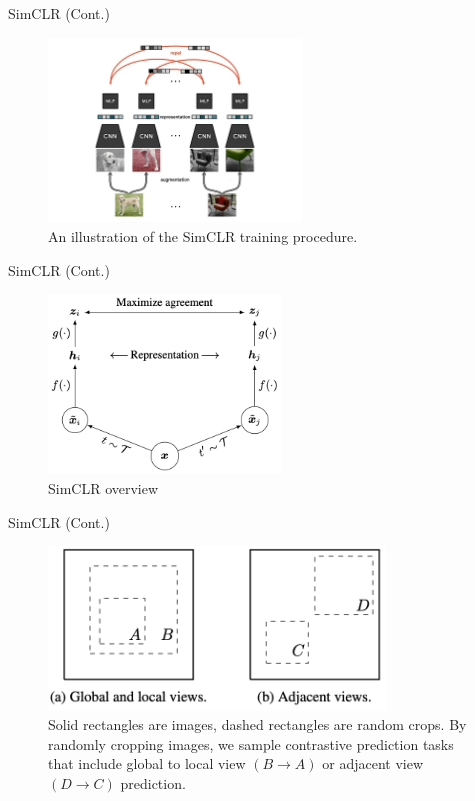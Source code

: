 \documentclass[serif, aspectratio=169]{beamer}
\begin{document}
\begin{frame}{SimCLR (Cont.)}
    \begin{figure}
        \setlength{\abovecaptionskip}{0pt}
        \setlength{\belowcaptionskip}{1pt}
        \centering
        \includegraphics[width=0.6\textwidth]{pic/simclr/2.png}
        \caption{An illustration of the SimCLR training procedure.}
   \end{figure}
\end{frame}


\begin{frame}{SimCLR (Cont.)}
    \begin{figure}
        \setlength{\abovecaptionskip}{0pt}
        \setlength{\belowcaptionskip}{1pt}
        \centering
        \includegraphics[width=0.55\textwidth]{pic/simclr/3.png}
        \caption{SimCLR overview}
   \end{figure}
\end{frame}


\begin{frame}{SimCLR (Cont.)}
    \begin{figure}
        \setlength{\abovecaptionskip}{0pt}
        \setlength{\belowcaptionskip}{1pt}
        \centering
        \includegraphics[width=0.8\textwidth]{pic/simclr/4.png}
        \caption{Solid rectangles are images, dashed rectangles are random crops. By randomly cropping images, we sample contrastive prediction tasks that include global to local view $\left(B \xrightarrow{} A\right)$ or adjacent view $\left(D \xrightarrow{} C\right)$ prediction.}
   \end{figure}
\end{frame}
\end{document}
